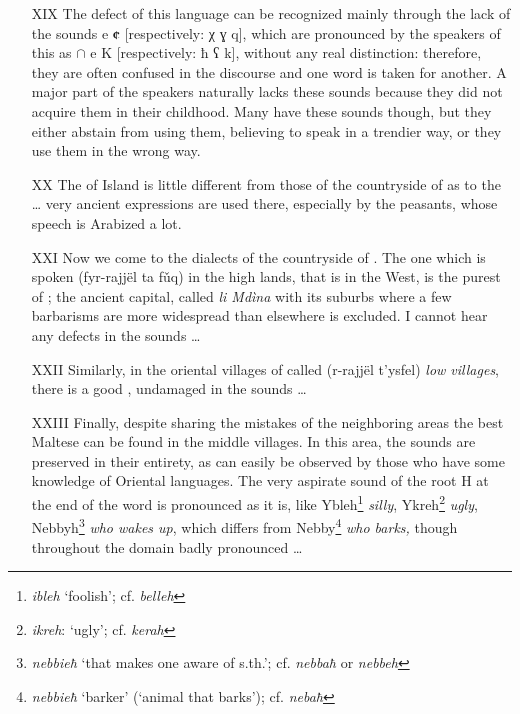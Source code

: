 \documentclass[output=paper]{langsci/langscibook}
\begin{document}
\begin{itemize}
\item[XIX]  The defect of this language can be recognized mainly through the lack of the sounds {\ⵀ} {\ᴟ} e \textbf{¢} [respectively: χ ɣ q], which are pronounced by the speakers of this  as {\ጸ} ${\cap}$ e K [respectively: ħ ʕ k], without any real distinction: therefore, they are often confused in the discourse and one word is taken for another. A major part of the speakers naturally lacks these sounds because they did not acquire them in their childhood. Many have these sounds though, but they either abstain from using them, believing to speak in a trendier way, or they use them in the wrong way.

\item[XX]  The  of  Island is little different from those of the countryside of  as to the  … very ancient  expressions are used there, especially by the peasants, whose speech is Arabized a lot.

\item[XXI]  Now we come to the dialects of the countryside of . The one which is spoken (fyr-r{\ጸ}ajjël ta fǔq) in the high lands, that is in the West, is the purest  of ; the ancient capital, called \textit{li Mdìna} with its suburbs where a few barbarisms are more widespread than elsewhere is excluded. I cannot hear any defects in the  sounds …

\item[XXII]  Similarly, in the oriental villages of  called (r-r{\ጸ}ajjël t’ysfel) \textit{low villages}, there is a good , undamaged in the  sounds …

\item[XXIII]  Finally, despite sharing the mistakes of the neighboring areas the best Maltese  can be found in the middle villages. In this area, the  sounds are preserved in their entirety, as can easily be observed by those who have some knowledge of Oriental languages. The very aspirate sound of the root H at the end of the word is pronounced as it is, like Ybleh\footnote{\textit{ibleh} `foolish'; cf. \textit{belleh}} \textit{silly}, Ykreh\footnote{\textit{ikreh}: `ugly'; cf. \textit{kerah}} \textit{ugly}, Nebbyh\footnote{\textit{nebbieħ} `that makes one aware of s.th.'; cf. \textit{nebbaħ} or \textit{nebbeh}} \textit{who wakes up}, which differs from Nebby{\ጸ}\footnote{\textit{nebbieħ} `barker' (`animal that barks'); cf. \textit{nebaħ}} \textit{who barks,} though throughout the domain badly pronounced {\ጸ} …
\end{itemize}
\end{document}
